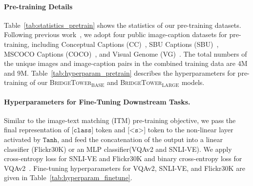 \documentclass[letterpaper]{article} %
\newcommand{\methodname}[0]{\textsc{BridgeTower}}
\newcommand{\modelbase}[0]{$_{\text{BASE}}$}
\newcommand{\modellarge}[0]{$_{\text{LARGE}}$}
\begin{document}
\paragraph{Pre-training Details}
Table~\ref{tab:statistics_pretrain} shows the statistics of our pre-training datasets.
Following previous work~\citep{kim2021vilt,chen2020uniter,li2021align,dou2021meter}, we adopt four public image-caption datasets for pre-training, including Conceptual Captions (CC)~\citep{sharma-etal-2018-conceptual}, SBU Captions (SBU)~\citep{NIPS2011_5dd9db5e}, MSCOCO Captions (COCO)~\citep{chen2015microsoft}, and Visual Genome (VG)~\citep{krishna2017visual}. 
The total numbers of the unique images and image-caption pairs in the combined training data are $4$M and $9$M. Table~\ref{tab:hyperparam_pretrain} describes the hyperparameters for pre-training of our \methodname{}\modelbase{} and \methodname{}\modellarge{} models. 

\paragraph{Hyperparameters for Fine-Tuning Downstream Tasks.}
Similar to the image-text matching (ITM) pre-training objective, we pass the final representation of $\texttt{[class]}$ token and $\texttt{[<s>]}$ token to the non-linear layer activated by $\texttt{Tanh}$, and feed the concatenation of the output into a linear classifier (Flickr30K) or an MLP classifier(VQAv2 and SNLI-VE). We apply cross-entropy loss for SNLI-VE and Flickr30K and binary cross-entropy loss for VQAv2~\citep{kim2021vilt,dou2021meter}. 
Fine-tuning hyperparameters for VQAv2, SNLI-VE, and Flickr30K are given in Table~\ref{tab:hyperparam_finetune}.

\clearpage

% 

\end{document}
